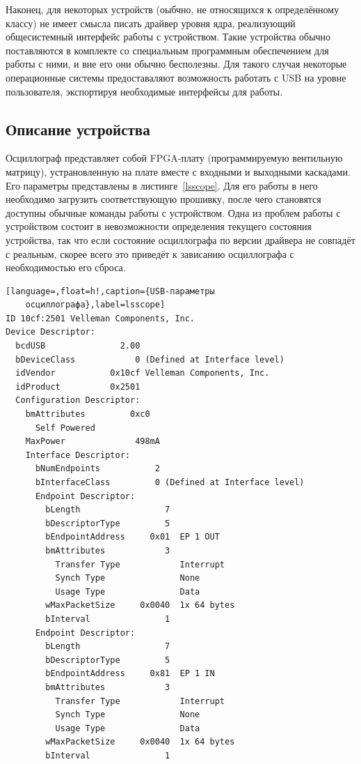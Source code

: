 \documentclass[a4paper,12pt]{report}
\numberwithin{equation}{section}
\begin{document}
Наконец, для некоторых устройств (оыбчно, не относящихся к определённому
классу) не имеет смысла писать драйвер уровня ядра, реализующий общесистемный
интерфейс работы с устройством. Такие устройства обычно поставляются в комплекте
со специальным программным обеспечением для работы с ними, и вне его они обычно
бесполезны. Для такого случая некоторые операционные системы предоставаляют
возможность работать с USB на уровне пользователя, экспортируя необходимые
интерфейсы для работы.

\subsection{Описание устройства}
Осциллограф представляет собой FPGA-плату (программируемую вентильную матрицу),
устрановленную на плате вместе с входными и выходными каскадами. Его параметры
представлены в листинге~\ref{lsscope}. Для его работы в него необходимо
загрузить соответствующую прошивку, после чего становятся доступны обычные
команды работы с устройством. Одна из проблем работы с устройством состоит в
невозможности определения текущего состояния устройства, так что если состояние
осциллографа по версии драйвера не совпадёт с реальным, скорее всего это
приведёт к зависанию осциллографа с необходимостью его сброса.

\begin{lstlisting}[language=,float=h!,caption={USB-параметры
    осциллографа},label=lsscope]
ID 10cf:2501 Velleman Components, Inc. 
Device Descriptor:
  bcdUSB               2.00
  bDeviceClass            0 (Defined at Interface level)
  idVendor           0x10cf Velleman Components, Inc.
  idProduct          0x2501 
  Configuration Descriptor:
    bmAttributes         0xc0
      Self Powered
    MaxPower              498mA
    Interface Descriptor:
      bNumEndpoints           2
      bInterfaceClass         0 (Defined at Interface level)
      Endpoint Descriptor:
        bLength                 7
        bDescriptorType         5
        bEndpointAddress     0x01  EP 1 OUT
        bmAttributes            3
          Transfer Type            Interrupt
          Synch Type               None
          Usage Type               Data
        wMaxPacketSize     0x0040  1x 64 bytes
        bInterval               1
      Endpoint Descriptor:
        bLength                 7
        bDescriptorType         5
        bEndpointAddress     0x81  EP 1 IN
        bmAttributes            3
          Transfer Type            Interrupt
          Synch Type               None
          Usage Type               Data
        wMaxPacketSize     0x0040  1x 64 bytes
        bInterval               1
\end{lstlisting}
\end{document}
